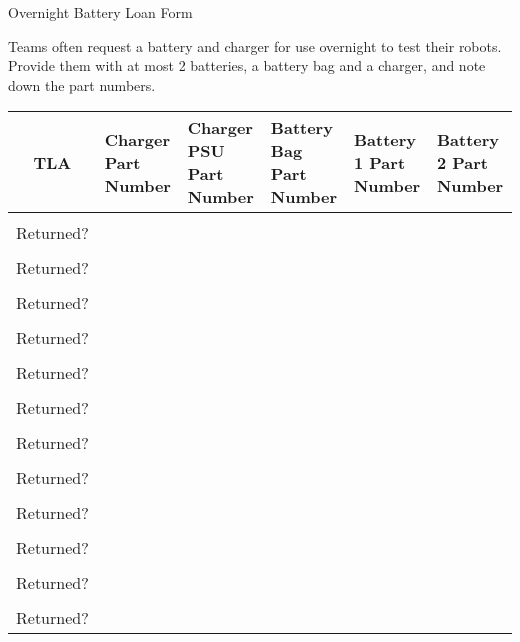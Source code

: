 \documentclass[a4paper, 12pt]{article}
\begin{document}
\begin{center}

    {\huge{Overnight Battery Loan Form}}

\end{center}

Teams often request a battery and charger for use overnight to test their robots. Provide them with at most 2 batteries, a battery bag and a charger, and note down the part numbers.

\begin{center}
\begin{table}[h]
\def\arraystretch{1.5}
\begin{tabularx}{\textwidth}{|c|Y|Y|Y|Y|Y|}
    \textbf{TLA} &
    \textbf{Charger Part Number} &
    \textbf{Charger PSU Part Number} &
    \textbf{Battery Bag Part Number} &
    \textbf{Battery 1 Part Number} &
    \textbf{Battery 2 Part Number} \\
\hline
\large
& & & & & \\  \hline {}
Returned? & & & & & \\ \hline
& & & & & \\  \hline {}
Returned? & & & & & \\ \hline
& & & & & \\  \hline {}
Returned? & & & & & \\ \hline
& & & & & \\  \hline {}
Returned? & & & & & \\ \hline
& & & & & \\  \hline {}
Returned? & & & & & \\ \hline
& & & & & \\  \hline {}
Returned? & & & & & \\ \hline
& & & & & \\  \hline {}
Returned? & & & & & \\ \hline
& & & & & \\  \hline {}
Returned? & & & & & \\ \hline
& & & & & \\  \hline {}
Returned? & & & & & \\ \hline
& & & & & \\  \hline {}
Returned? & & & & & \\ \hline
& & & & & \\  \hline {}
Returned? & & & & & \\ \hline
& & & & & \\  \hline {}
Returned? & & & & & \\ \hline
\end{tabularx}
\end{table}
\end{center}
\end{document}
